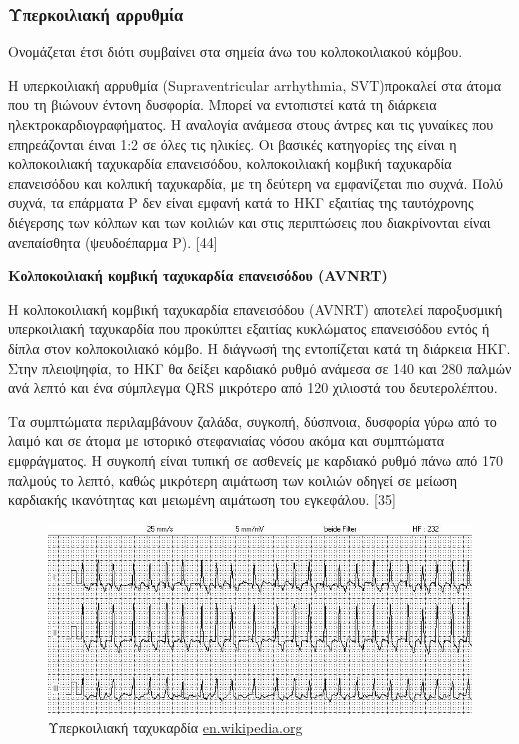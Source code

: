 \subsubsection{Υπερκοιλιακή αρρυθμία} Ονομάζεται έτσι διότι συμβαίνει στα σημεία άνω του κολποκοιλιακού κόμβου.
\par
Η υπερκοιλιακή αρρυθμία \en (Supraventricular arrhythmia, SVT)\gr προκαλεί στα άτομα που τη βιώνουν έντονη δυσφορία. Μπορεί να εντοπιστεί κατά τη διάρκεια ηλεκτροκαρδιογραφήματος. Η αναλογία ανάμεσα στους άντρες και τις γυναίκες που επηρεάζονται έιναι 1:2 σε όλες τις ηλικίες. Οι βασικές κατηγορίες της είναι η κολποκοιλιακή ταχυκαρδία επανεισόδου, κολποκοιλιακή κομβική ταχυκαρδία επανεισόδου και κολπική ταχυκαρδία, με τη δεύτερη να εμφανίζεται πιο συχνά. Πολύ συχνά, τα επάρματα Ρ δεν είναι εμφανή κατά το ΗΚΓ εξαιτίας της ταυτόχρονης διέγερσης των κόλπων και των κοιλιών και στις περιπτώσεις που διακρίνονται είναι ανεπαίσθητα (ψευδοέπαρμα Ρ). [44]
\par
\textbf{Κολποκοιλιακή κομβική ταχυκαρδία επανεισόδου \en (AVNRT)} \gr \par
\gr Η κολποκοιλιακή κομβική ταχυκαρδία επανεισόδου \en (AVNRT) \gr αποτελεί παροξυσμική υπερκοιλιακή ταχυκαρδία που προκύπτει εξαιτίας κυκλώματος επανεισόδου εντός ή δίπλα στον κολποκοιλιακό κόμβο. Η διάγνωσή της εντοπίζεται κατά τη διάρκεια ΗΚΓ. Στην πλειοψηφία, το ΗΚΓ θα δείξει καρδιακό ρυθμό ανάμεσα σε 140 και 280 παλμών ανά λεπτό και ένα σύμπλεγμα \en QRS \gr μικρότερο από 120 χιλιοστά του δευτερολέπτου. 
\par
Τα συμπτώματα περιλαμβάνουν ζαλάδα, συγκοπή, δύσπνοια, δυσφορία γύρω από το λαιμό και σε άτομα με ιστορικό στεφανιαίας νόσου ακόμα και συμπτώματα εμφράγματος. Η συγκοπή είναι τυπική σε ασθενείς με καρδιακό ρυθμό πάνω από 170 παλμούς το λεπτό, καθώς μικρότερη αιμάτωση των κοιλιών οδηγεί σε μείωση  καρδιακής ικανότητας και μειωμένη αιμάτωση του εγκεφάλου. [35] 
\par

\begin{figure}[h]
	\centering
	\includegraphics[scale=0.3]{supraventricular tachychardia.jpg}
	\caption{Υπερκοιλιακή ταχυκαρδία \en\protect\url{en.wikipedia.org}}
\end{figure}
